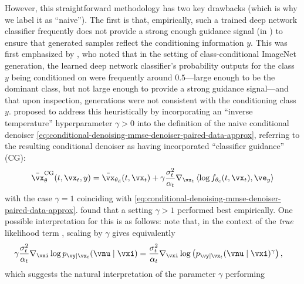 \documentclass[../../book-main.tex]{subfiles}
\begin{document}
However, this straightforward methodology has two key drawbacks (which is why we
label it as ``naive''). The first is
that, empirically, such a trained deep network classifier frequently does not
provide a strong enough guidance signal (in
) to ensure that
generated samples reflect the conditioning information $y$. This was first
emphasized by \citet{Dhariwal2021-hg}, who noted that in the setting of
class-conditional ImageNet generation, the learned deep network
classifier's probability outputs for the class $y$ being conditioned on were
frequently around
$0.5$---large enough to be the dominant class, but not large enough to provide
a strong guidance signal---and that upon inspection, generations were not
consistent with the conditioning class $y$. \citet{Dhariwal2021-hg} proposed to
address this heuristically by incorporating an ``inverse temperature''
hyperparameter $\gamma > 0$
into the definition of the naive conditional denoiser
\eqref{eq:conditional-denoising-mmse-denoiser-paired-data-approx}, referring to the
resulting conditional denoiser as having incorporated ``classifier guidance''
(CG):
\begin{equation}\label{eq:conditional-denoising-mmse-denoiser-paired-data-approx-cg}
  \bar{\vx}_{\theta}^{\mathrm{CG}}(t, \vx_t, y)
  =
  \bar{\vx}_{\theta_{\mathrm{d}}}(t, \vx_t)
  + \gamma\frac{\sigma_t^2}{\alpha_t}
  \nabla_{\vx_t}
  \ip*{
    \log f_{\theta_{\mathrm{c}}}(t, \vx_t)
  }{
    \ve_{y}
  }
\end{equation}
with the case $\gamma = 1$ coinciding with
\eqref{eq:conditional-denoising-mmse-denoiser-paired-data-approx}.
\citet{Dhariwal2021-hg} found that a setting $\gamma > 1$ performed best empirically.
One possible interpretation for this is as follows: note that, in the context of
the \textit{true} likelihood term
, scaling by $\gamma$
gives equivalently
\begin{align}
  \gamma\frac{\sigma_t^2}{\alpha_t} \nabla_{\vxi}\log p_{\vy \mid \vx_t}(\vnu\mid
  \vxi)
  &=
  \frac{\sigma_t^2}{\alpha_t} \nabla_{\vxi}\log \left(
  p_{\vy \mid \vx_t}(\vnu\mid \vxi)^\gamma
  \right), %
\end{align}
which suggests the natural interpretation of the parameter $\gamma$ performing
\end{document}
